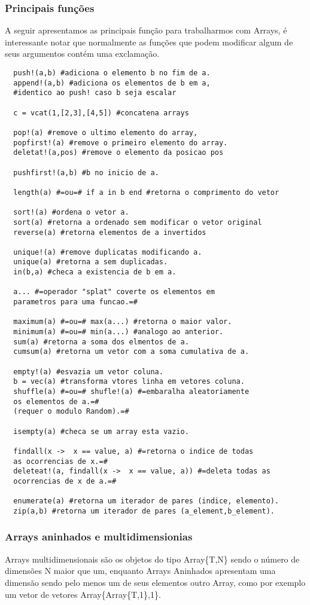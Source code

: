 \subsubsection{Principais funções}
A seguir apresentamos as principais função para trabalharmos com Arrays, é interessante notar que normalmente as funções que podem modificar algum de seus argumentos contém uma exclamação.
\begin{lstlisting}
  push!(a,b) #adiciona o elemento b no fim de a.
  append!(a,b) #adiciona os elementos de b em a,
  #identico ao push! caso b seja escalar

  c = vcat(1,[2,3],[4,5]) #concatena arrays

  pop!(a) #remove o ultimo elemento do array,
  popfirst!(a) #remove o primeiro elemento do array.
  deletat!(a,pos) #remove o elemento da posicao pos

  pushfirst!(a,b) #b no inicio de a.

  length(a) #=ou=# if a in b end #retorna o comprimento do vetor

  sort!(a) #ordena o vetor a.
  sort(a) #retorna a ordenado sem modificar o vetor original
  reverse(a) #retorna elementos de a invertidos

  unique!(a) #remove duplicatas modificando a.
  unique(a) #retorna a sem duplicadas. 
  in(b,a) #checa a existencia de b em a.

  a... #=operador "splat" coverte os elementos em 
  parametros para uma funcao.=#

  maximum(a) #=ou=# max(a...) #retorna o maior valor.
  minimum(a) #=ou=# min(a...) #analogo ao anterior.
  sum(a) #retorna a soma dos elmentos de a.
  cumsum(a) #retorna um vetor com a soma cumulativa de a.

  empty!(a) #esvazia um vetor coluna.
  b = vec(a) #transforma vtores linha em vetores coluna.
  shuffle(a) #=ou=# shufle!(a) #=embaralha aleatoriamente 
  os elementos de a.=# 
  (requer o modulo Random).=#

  isempty(a) #checa se um array esta vazio.

  findall(x ->  x == value, a) #=retorna o indice de todas
  as ocorrencias de x.=#
  deleteat!(a, findall(x ->  x == value, a)) #=deleta todas as 
  ocorrencias de x de a.=#

  enumerate(a) #retorna um iterador de pares (indice, elemento).
  zip(a,b) #retorna um iterador de pares (a_element,b_element).
\end{lstlisting}

\subsubsection{Arrays aninhados e multidimensionias}
Arrays multidimensionais são os objetos do tipo Array\{T,N\} sendo o número de dimensões N maior que um, enquanto Arrays Aninhados apresentam uma dimensão sendo pelo menos um de seus elementos outro Array, como por exemplo um vetor de vetores Array\{Array\{T,1\},1\}.

